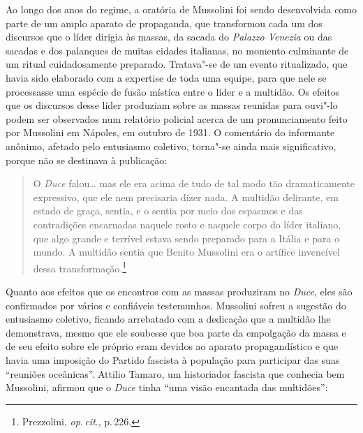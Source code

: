 Ao longo dos anos do regime, a oratória de Mussolini foi sendo
desenvolvida como parte de um amplo aparato de propaganda, que
transformou cada um dos discursos que o líder dirigia às massas, da
sacada do \emph{Palazzo Venezia} ou das sacadas e dos palanques de
muitas cidades italianas, no momento culminante de um ritual
cuidadosamente preparado. Tratava"-se de um evento ritualizado, que havia
sido elaborado com a expertise de toda uma equipe, para que nele se
processasse uma espécie de fusão mística entre o líder e a multidão. Os
efeitos que os discursos desse líder produziam sobre as massas reunidas
para ouvi"-lo podem ser observados num relatório policial acerca de um
pronunciamento feito por Mussolini em Nápoles, em outubro de 1931. O
comentário do informante anônimo, afetado pelo entusiasmo coletivo,
torna"-se ainda mais significativo, porque não se destinava à publicação:

\begin{quote}
O \emph{Duce} falou\ldots{} mas ele era acima de tudo de tal modo tão
dramaticamente expressivo, que ele nem precisaria dizer nada. A multidão
delirante, em estado de graça, sentia, e o sentia por meio dos espasmos
e das contradições encarnadas naquele rosto e naquele corpo do líder
italiano, que algo grande e terrível estava sendo preparado para a
Itália e para o mundo. A multidão sentia que Benito Mussolini era o
artífice invencível dessa transformação.\footnote{Prezzolini, \emph{op.\,cit}., p.\,226.}
\end{quote}

Quanto aos efeitos que os encontros com as massas produziram no
\emph{Duce}, eles são confirmados por vários e confiáveis testemunhos.
Mussolini sofreu a sugestão do entusiasmo coletivo, ficando arrebatado
com a dedicação que a multidão lhe demonstrava, mesmo que ele soubesse
que boa parte da empolgação da massa e de seu efeito sobre ele próprio
eram devidos ao aparato propagandístico e que havia uma imposição do
Partido fascista à população para participar das suas ``reuniões
oceânicas''. Attilio Tamaro, um historiador fascista que conhecia bem
Mussolini, afirmou que o \emph{Duce} tinha ``uma visão encantada das
multidões'':

